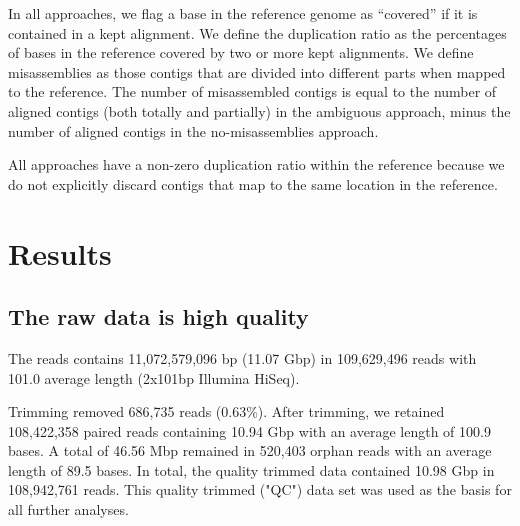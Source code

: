 \documentclass[10pt,a4paper,twocolumn]{article}
\begin{document}
In all approaches, we flag a base in the reference genome as
``covered'' if it is contained in a kept alignment.  We define the
duplication ratio as the percentages of bases in the reference covered
by two or more kept alignments. We define misassemblies as
those contigs that are divided into different parts when mapped to the
reference.  The number of misassembled contigs is equal to the number
of aligned contigs (both totally and partially) in the ambiguous
approach, minus the number of aligned contigs in the no-misassemblies
approach.


All approaches have a non-zero duplication ratio within the reference
because we do not explicitly discard contigs that map to the same
location in the reference.



\section*{Results}

\subsection*{The raw data is high quality}

The reads contains 11,072,579,096 bp (11.07 Gbp) in 109,629,496 reads
with 101.0 average length (2x101bp Illumina HiSeq).

Trimming removed 686,735 reads (0.63\%).  After trimming, we retained
108,422,358 paired reads containing 10.94 Gbp with an average length of
100.9 bases. A total of 46.56 Mbp remained in 520,403 orphan reads with
an average length of 89.5 bases. In total, the quality trimmed data
contained 10.98 Gbp in 108,942,761 reads.  This quality trimmed ("QC")
data set was used as the basis for all further analyses.
\end{document}
